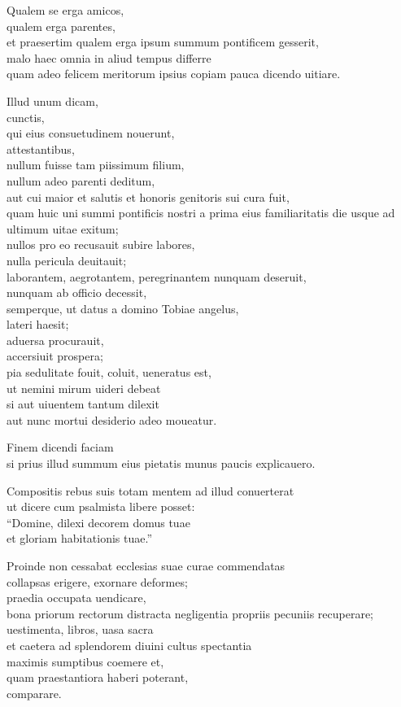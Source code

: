\documentclass[a5paper,twoside]{article}
\begin{document}
Qualem se erga amicos, \\
qualem erga parentes, \\
et praesertim qualem erga ipsum summum pontificem gesserit, \\
malo haec omnia in aliud tempus differre \\
quam adeo felicem meritorum ipsius copiam pauca dicendo uitiare.   

Illud unum dicam, \\
cunctis, \\
qui eius consuetudinem nouerunt, \\
attestantibus, \\
nullum fuisse tam piissimum filium, \\
nullum adeo parenti deditum, \\
aut cui maior et salutis et honoris genitoris sui cura fuit, \\
quam huic uni summi pontificis nostri a prima eius familiaritatis die usque ad ultimum uitae exitum; \\
nullos pro eo recusauit subire labores, \\
nulla pericula deuitauit; \\
laborantem, aegrotantem, peregrinantem nunquam deseruit, \\
nunquam ab officio decessit, \\
semperque, ut datus a domino Tobiae angelus, \\
lateri haesit; \\
aduersa procurauit, \\
accersiuit prospera; \\
pia sedulitate fouit, coluit, ueneratus est, \\
ut nemini mirum uideri debeat \\
si aut uiuentem tantum dilexit \\
aut nunc mortui desiderio adeo moueatur.

Finem dicendi faciam \\
si prius illud summum eius pietatis munus paucis explicauero.  

Compositis rebus suis totam mentem ad illud conuerterat \\
ut dicere cum psalmista libere posset: \\
``Domine, dilexi decorem domus tuae \\
et gloriam habitationis tuae.''  

Proinde non cessabat ecclesias suae curae commendatas \\
collapsas erigere, exornare deformes; \\
praedia occupata uendicare, \\
bona priorum rectorum distracta negligentia propriis pecuniis recuperare; \\
uestimenta, libros, uasa sacra \\
et caetera ad splendorem diuini cultus spectantia \\
maximis sumptibus coemere et, \\
quam praestantiora haberi poterant, \\
comparare.  
\end{document}
